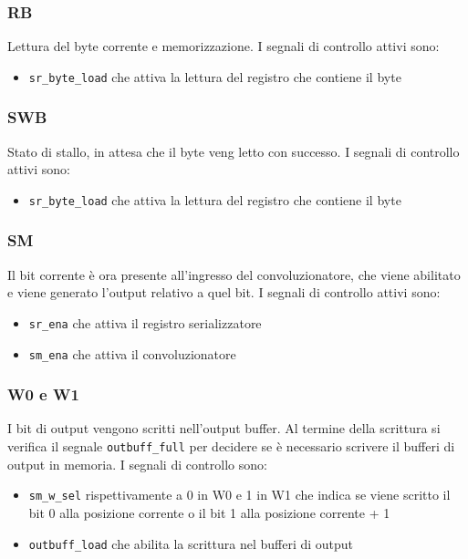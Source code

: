 \documentclass[12pt, a4paper]{article}
\begin{document}
\subsubsection{RB}
Lettura del byte corrente e memorizzazione.
I segnali di controllo attivi sono:
\begin{itemize}
    \item \texttt{sr\_byte\_load} che attiva la lettura del registro che contiene il byte
\end{itemize}

\subsubsection{SWB}
Stato di stallo, in attesa che il byte veng letto con successo.
I segnali di controllo attivi sono:
\begin{itemize}
    \item \texttt{sr\_byte\_load} che attiva la lettura del registro che contiene il byte
\end{itemize}

\subsubsection{SM}
Il bit corrente è ora presente all'ingresso del convoluzionatore, che viene abilitato e viene
generato l'output relativo a quel bit.
I segnali di controllo attivi sono:
\begin{itemize}
    \item \texttt{sr\_ena} che attiva il registro serializzatore
    \item \texttt{sm\_ena} che attiva il convoluzionatore
\end{itemize}

\subsubsection{W0 e W1}
I bit di output vengono scritti nell'output buffer.
Al termine della scrittura si verifica il segnale \texttt{outbuff\_full} per decidere
se è necessario scrivere il bufferi di output in memoria.
I segnali di controllo sono:
\begin{itemize}
    \item \texttt{sm\_w\_sel} rispettivamente a 0 in W0 e 1 in W1 che indica se viene 
                              scritto il bit 0 alla posizione corrente o il bit 1 alla posizione corrente + 1
    \item \texttt{outbuff\_load} che abilita la scrittura nel bufferi di output
\end{itemize}
\end{document}

